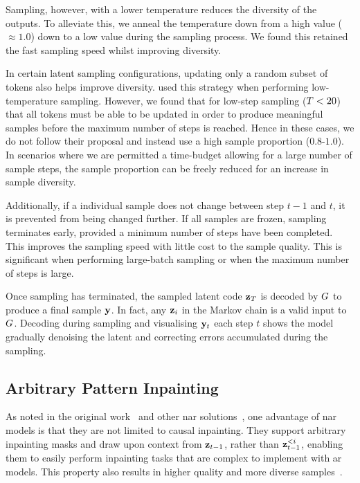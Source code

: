 Sampling, however, with a lower temperature reduces the diversity of the
outputs. To alleviate this, we anneal the temperature down
from a high value ($\approx 1.0$) down to a low value during the
sampling process. We found this retained the fast sampling speed whilst 
improving diversity.

In certain latent sampling configurations, updating only a random subset of
tokens also helps improve diversity. \citet{savinov2022stepunrolled} used this
strategy when performing low-temperature sampling. However, we found that for
low-step sampling ($T<20$) that all tokens must be able to be updated
in order to produce meaningful samples before the maximum number of steps is
reached. Hence in these cases, we do not follow their proposal and instead use a
high sample proportion ($0.8$-$1.0$). In scenarios where we are permitted a
time-budget allowing for a large number of sample steps, the sample proportion
can be freely reduced for an increase in sample diversity.

Additionally, if a individual sample does not change between step $t-1$ and $t$,
it is prevented from being changed further. If all samples are frozen, sampling
terminates early, provided a minimum number of steps have been completed. This
improves the sampling speed with little cost to the sample quality. This
is significant when performing large-batch sampling or when the maximum number
of steps is large.

Once sampling has terminated, the sampled latent code $\mathbf{z}_T$ is decoded by
$G$ to produce a final sample $\mathbf{y}$. In fact, any $\mathbf{z}_i$ in
the Markov chain is a valid input to $G$. Decoding during sampling
and visualising $\mathbf{y}_t$ each step $t$ shows the model gradually denoising the
latent and correcting errors accumulated during the sampling.

\subsection{Arbitrary Pattern Inpainting}
\label{subsec:inpainting}

As noted in the original work~\cite{savinov2022stepunrolled} and other \gls{nar}
solutions~\cite{bondtaylor2021unleashing}, one advantage of \gls{nar} models is
that they are not limited to causal inpainting. They support arbitrary
inpainting masks and draw upon context from $\mathbf{z}_{t-1}$, rather than
$\mathbf{z}_{t-1}^{<i}$, enabling them to easily perform inpainting tasks that are
complex to implement with \gls{ar} models. This property also results in 
higher quality and more diverse samples~\cite{bondtaylor2021unleashing}.

